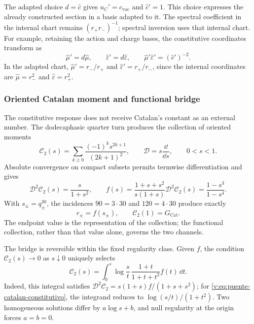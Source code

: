 The adapted choice $d=\widehat c$ gives $u_C'=c_{\mathrm{vac}}$ and
$\widehat c'=1$. This choice expresses the already constructed section in a
basis adapted to it. The spectral coefficient in the internal chart remains
$(r_+r_-)^{-1}$; spectral inversion uses that internal chart.
For example, retaining the action and charge bases, the constitutive
coordinates transform as
\[
 \widehat\mu'=d\widehat\mu,
 \qquad \widehat\varepsilon'=d\widehat\varepsilon,
 \qquad
 \widehat\mu'\widehat\varepsilon'=(\widehat c')^{-2}.
\]
In the adapted chart, $\widehat\mu'=r_-/r_+$ and
$\widehat\varepsilon'=r_+/r_-$, since the internal coordinates are
$\widehat\mu=r_-^2$ and $\widehat\varepsilon=r_+^2$.

\subsubsection{Oriented Catalan moment and functional bridge}

The constitutive response does not receive Catalan's constant as an
external number. The dodecaphasic quarter turn produces the collection of
oriented moments
\begin{equation}
 \mathcal C_2(s)=\sum_{k\geq0}
 \frac{(-1)^ks^{2k+1}}{(2k+1)^2},\qquad
 \mathcal D=s\frac{\dd}{\dd s},\qquad 0<s<1.
 \label{v:eq:momento-catalan}
\end{equation}
Absolute convergence on compact subsets permits termwise differentiation
and gives
\begin{equation}
 \mathcal D^2\mathcal C_2(s)=\frac{s}{1+s^2},\qquad
 f(s)=\frac{1+s+s^2}{s(1+s)}\mathcal D^2\mathcal C_2(s)
 =\frac{1-s^3}{1-s^4}.
 \label{v:eq:puente-catalan-constitutivo}
\end{equation}
With $s_\pm=q_\pm^{30}$, the incidences $90=3\cdot30$ and
$120=4\cdot30$ produce exactly
\begin{equation}
 r_\pm=f(s_\pm),\qquad
 \mathcal C_2(1)=G_{\mathrm{Cat}}.
 \label{v:eq:catalan-canales}
\end{equation}
The endpoint value is the representation of the collection; the functional
collection, rather than that value alone, governs the two channels.

The bridge is reversible within the fixed regularity class. Given $f$,
the condition $\mathcal C_2(s)\to0$ as $s\downarrow0$ uniquely selects
\begin{equation}
 \mathcal C_2(s)=\int_0^s\log\frac{s}{t}\,
 \frac{1+t}{1+t+t^2}f(t)\,\dd t.
 \label{v:eq:restitucion-funcional-catalan}
\end{equation}
Indeed, this integral satisfies
$\mathcal D^2\mathcal C_2=s(1+s)f/(1+s+s^2)$; for
\eqref{v:eq:puente-catalan-constitutivo}, the integrand reduces to
$\log(s/t)/(1+t^2)$. Two homogeneous solutions differ by
$a\log s+b$, and null regularity at the origin forces $a=b=0$.

